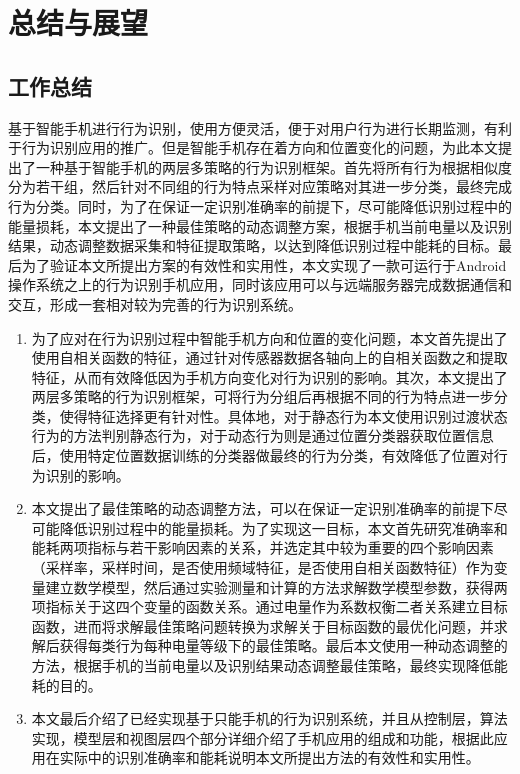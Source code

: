 ﻿\chapter{总结与展望}

\section{工作总结}
\par 基于智能手机进行行为识别，使用方便灵活，便于对用户行为进行长期监测，有利于行为识别应用的推广。但是智能手机存在着方向和位置变化的问题，为此本文提出了一种基于智能手机的两层多策略的行为识别框架。首先将所有行为根据相似度分为若干组，然后针对不同组的行为特点采样对应策略对其进一步分类，最终完成行为分类。同时，为了在保证一定识别准确率的前提下，尽可能降低识别过程中的能量损耗，本文提出了一种最佳策略的动态调整方案，根据手机当前电量以及识别结果，动态调整数据采集和特征提取策略，以达到降低识别过程中能耗的目标。最后为了验证本文所提出方案的有效性和实用性，本文实现了一款可运行于Android操作系统之上的行为识别手机应用，同时该应用可以与远端服务器完成数据通信和交互，形成一套相对较为完善的行为识别系统。
\begin{enumerate}
	\item 为了应对在行为识别过程中智能手机方向和位置的变化问题，本文首先提出了使用自相关函数的特征，通过针对传感器数据各轴向上的自相关函数之和提取特征，从而有效降低因为手机方向变化对行为识别的影响。其次，本文提出了两层多策略的行为识别框架，可将行为分组后再根据不同的行为特点进一步分类，使得特征选择更有针对性。具体地，对于静态行为本文使用识别过渡状态行为的方法判别静态行为，对于动态行为则是通过位置分类器获取位置信息后，使用特定位置数据训练的分类器做最终的行为分类，有效降低了位置对行为识别的影响。
	\item 本文提出了最佳策略的动态调整方法，可以在保证一定识别准确率的前提下尽可能降低识别过程中的能量损耗。为了实现这一目标，本文首先研究准确率和能耗两项指标与若干影响因素的关系，并选定其中较为重要的四个影响因素（采样率，采样时间，是否使用频域特征，是否使用自相关函数特征）作为变量建立数学模型，然后通过实验测量和计算的方法求解数学模型参数，获得两项指标关于这四个变量的函数关系。通过电量作为系数权衡二者关系建立目标函数，进而将求解最佳策略问题转换为求解关于目标函数的最优化问题，并求解后获得每类行为每种电量等级下的最佳策略。最后本文使用一种动态调整的方法，根据手机的当前电量以及识别结果动态调整最佳策略，最终实现降低能耗的目的。
	\item 本文最后介绍了已经实现基于只能手机的行为识别系统，并且从控制层，算法实现，模型层和视图层四个部分详细介绍了手机应用的组成和功能，根据此应用在实际中的识别准确率和能耗说明本文所提出方法的有效性和实用性。
\end{enumerate}	
